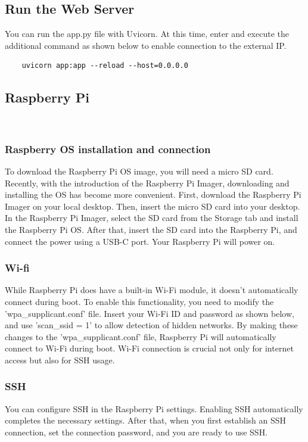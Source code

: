 \subsection{\textbf{Run the Web Server}}
You can run the app.py file with Uvicorn. At this time, enter and execute the additional command as shown below to enable connection to the external IP.
\begin{verbatim}
    uvicorn app:app --reload --host=0.0.0.0
\end{verbatim}

\subsection{\textbf{Raspberry Pi}}
\\

\subsubsection{\textbf{Raspberry OS installation and connection}}
To download the Raspberry Pi OS image, you will need a micro SD card. Recently, with the introduction of the Raspberry Pi Imager, downloading and installing the OS has become more convenient.
First, download the Raspberry Pi Imager on your local desktop. Then, insert the micro SD card into your desktop. In the Raspberry Pi Imager, select the SD card from the Storage tab and install the Raspberry Pi OS.
After that, insert the SD card into the Raspberry Pi, and connect the power using a USB-C port. Your Raspberry Pi will power on.\\

\subsubsection{\textbf{Wi-fi}}
While Raspberry Pi does have a built-in Wi-Fi module, it doesn't automatically connect during boot. To enable this functionality, you need to modify the 'wpa\_supplicant.conf' file. Insert your Wi-Fi ID and password as shown below, and use 'scan\_ssid = 1' to allow detection of hidden networks. By making these changes to the 'wpa\_supplicant.conf' file, Raspberry Pi will automatically connect to Wi-Fi during boot. Wi-Fi connection is crucial not only for internet access but also for SSH usage.\\

\subsubsection{\textbf{SSH}}
You can configure SSH in the Raspberry Pi settings. Enabling SSH automatically completes the necessary settings. After that, when you first establish an SSH connection, set the connection password, and you are ready to use SSH.
\\

